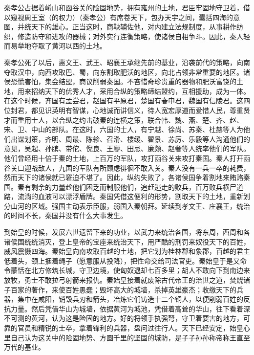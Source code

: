 \documentclass[12pt,UTF-8,openany,a4]{ctexbook}
\begin{document}
\begin{large}\yiwen
    
    秦孝公占据着崤山和函谷关的险固地势，拥有雍州的土地，君臣牢固地守卫着，借以窥视周王室（的权力）（秦孝公）有席卷天下，包办天宇之间，囊括四海的意图，并统天下的雄心。正当这时，商鞅辅佐他，对内建立法规制度，从事耕作纺织，修造防守和进攻的器械；对外实行连衡策略，使诸侯自相争斗。因此，秦人轻而易举地夺取了黄河以西的土地。
    
    秦孝公死了以后，惠文王、武王、昭襄王承继先前的基业，沿袭前代的策略，向南夺取汉中，向西攻取巴、蜀，向东割取肥沃的地区，向北占领非常重要的地区。诸侯恐慌害怕，集会结盟，商议削弱秦国。不吝惜奇珍贵重的器物和肥沃富饶的土地，用来招纳天下的优秀人才，采用合纵的策略缔结盟约，互相援助，成为一体。在这个时候，齐国有孟尝君，赵国有平原君，楚国有春申君，魏国有信陵君。这四位封君，都见识英明有智谋，心地诚而讲信义，待人宽宏厚道而爱惜人民，尊重贤才而重用士人，以合纵之约击破秦的连横之策，联合韩、魏、燕、楚、齐、赵、宋、卫、中山的部队。在这时，六国的士人，有宁越、徐尚、苏秦、杜赫等人为他们出谋划策，齐明、周最、陈轸、召滑、楼缓、翟景、苏厉、乐毅等人沟通他们的意见，吴起、孙膑、带佗、倪良、王廖、田忌、廉颇、赵奢等人统率他们的军队。他们曾经用十倍于秦的土地，上百万的军队，攻打函谷关来攻打秦国。秦人打开函谷关口迎战敌人，九国的军队有所顾虑徘徊不敢入关。秦人没有一兵一卒的耗费，然而天下的诸侯就已窘迫不堪了。因此，纵约失败了，各诸侯国争着割地来贿赂秦国。秦有剩余的力量趁他们困乏而制服他们，追赶逃走的败兵，百万败兵横尸道路，流淌的血液可以漂浮盾牌。秦国凭借这便利的形势，割取天下的土地，重新划分山河的区域。强国主动表示臣服，弱国入秦朝拜。延续到孝文王、庄襄王，统治的时间不长，秦国并没有什么大事发生。
    
    到始皇的时候，发展六世遗留下来的功业，以武力来统治各国，将东周，西周和各诸侯国统统消灭，登上皇帝的宝座来统治天下，用严酷的刑罚来奴役天下的百姓，威风震慑四海。秦始皇向南攻取百越的土地，把它划为桂林郡和象郡，百越的君主低着头，颈上捆着绳子（愿意服从投降），把性命交给司法官吏。秦始皇于是又命令蒙恬在北方修筑长城，守卫边境，使匈奴退却七百多里；胡人不敢向下到南边来放牧，勇士不敢拉弓射箭来报仇。秦始皇接着就废除古代帝王的治世之道，焚烧诸子百家的著作，来使百姓愚蠢；毁坏高大的城墙，杀掉英雄豪杰；收缴天下的兵器，集中在咸阳，销毁兵刃和箭头，冶炼它们铸造十二个铜人，以便削弱百姓的反抗力量。然后凭借华山为城墙，依据黄河为城池，凭借着高耸的华山，往下看着深不可测的黄河，认为这是险固的地方。好的将领手执强弩，守卫着要害的地方，可靠的官员和精锐的士卒，拿着锋利的兵器，盘问过往行人。天下已经安定，始皇心里自己认为这关中的险固地势、方圆千里的坚固的城防，是子子孙孙称帝称王直至万代的基业。
    

\end{large}
\end{document}
